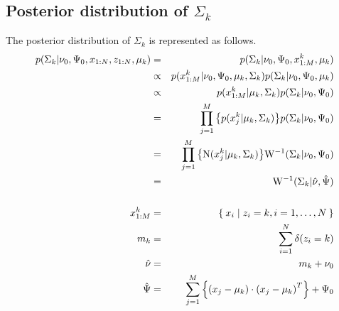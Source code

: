 \documentclass[a4paper]{article}
\begin{document}
\subsection{Posterior distribution of $\Sigma_k$}
The posterior distribution of $\Sigma_k$ is represented as follows.
\begin{eqnarray}
	p(\Sigma_k | \nu_0, \Psi_0, x_{1:N}, z_{1:N}, \mu_k) &=& p(\Sigma_k | \nu_0, \Psi_0, x^{k}_{1:M}, \mu_k)\\
	&\propto& p(x^{k}_{1:M} | \nu_0, \Psi_0, \mu_k, \Sigma_k) p(\Sigma_k | \nu_0, \Psi_0, \mu_k)\\
	&\propto& p(x^{k}_{1:M} | \mu_k, \Sigma_k) p(\Sigma_k | \nu_0, \Psi_0)\\
	&=& \prod_{j=1}^{M}{\left\{ p(x^{k}_{j} | \mu_k, \Sigma_k) \right\}} p(\Sigma_k | \nu_0, \Psi_0)\\
	&=& \prod_{j=1}^{M}{\left\{ {\rm N}(x^{k}_{j} | \mu_k, \Sigma_k) \right\}} {\rm W}^{-1}(\Sigma_k | \nu_0, \Psi_0)\\
	&=& {\rm W}^{-1}(\Sigma_k | \hat{\nu}, \hat{\Psi})\\
	\nonumber \\
	x^{k}_{1:M} &=& \Set{ x_i | z_i = k, i=1, \ldots, N }\\
	m_k &=& \sum_{i=1}^{N}{\delta(z_i = k)}\\
	\hat{\nu} &=& m_k + \nu_0\\
	\hat{\Psi} &=& \sum_{j=1}^{M}{\left\{ \left(x_j - \mu_k \right) \cdot \left( x_j - \mu_k \right)^T \right\}} + \Psi_0
\end{eqnarray}
\end{document}
